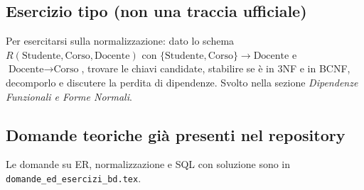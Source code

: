 \subsection*{Esercizio tipo (non una traccia ufficiale)}
Per esercitarsi sulla normalizzazione: dato lo schema $R(\text{Studente},\text{Corso},\text{Docente})$ con $\{\text{Studente},\text{Corso}\}\to\text{Docente}$ e $\text{Docente}\to\text{Corso}$, trovare le chiavi candidate, stabilire se è in 3NF e in BCNF, decomporlo e discutere la perdita di dipendenze. Svolto nella sezione \emph{Dipendenze Funzionali e Forme Normali}.

\subsection*{Domande teoriche già presenti nel repository}
Le domande su ER, normalizzazione e SQL con soluzione sono in \texttt{domande\_ed\_esercizi\_bd.tex}.
